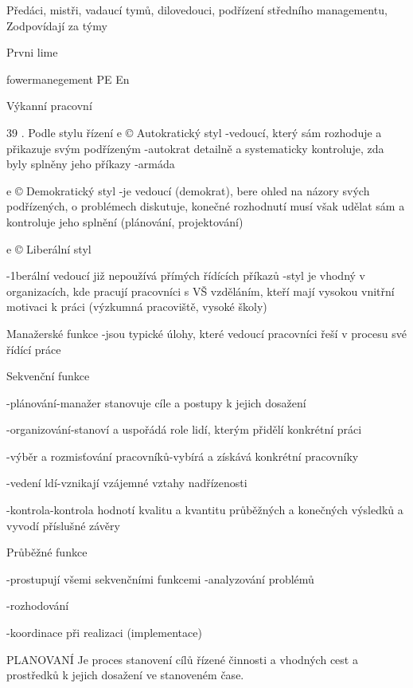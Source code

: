 Předáci, mistři, vadaucí tymů, dilovedouci,
podřízení středního managementu,
Zodpovídají za týmy





Prvni lime

fowermanegement PE En







Výkanní pracovní

39
. Podle stylu řízení
e © Autokratický styl
-vedoucí, který sám rozhoduje a přikazuje svým podřízeným
-autokrat detailně a systematicky kontroluje, zda byly splněny jeho příkazy
-armáda



e © Demokratický styl
-je vedoucí (demokrat), bere ohled na názory svých podřízených, o problémech
diskutuje, konečné rozhodnutí musí však udělat sám a kontroluje jeho splnění
(plánování, projektování)



e © Liberální styl



-1berální vedoucí již nepoužívá přímých řídících příkazů
-styl je vhodný v organizacích, kde pracují pracovníci s VŠ vzděláním, kteří mají
vysokou vnitřní motivaci k práci (výzkumná pracoviště, vysoké školy)

Manažerské funkce
-jsou typické úlohy, které vedoucí pracovníci řeší v procesu své řídící práce

Sekvenční funkce

-plánování-manažer stanovuje cíle a postupy k jejich dosažení

-organizování-stanoví a uspořádá role lidí, kterým přidělí konkrétní práci

-výběr a rozmisťování pracovníků-vybírá a získává konkrétní pracovníky

-vedení ldí-vznikají vzájemné vztahy nadřízenosti

-kontrola-kontrola hodnotí kvalitu a kvantitu průběžných a konečných výsledků
a vyvodí příslušné závěry

Průběžné funkce

-prostupují všemi sekvenčními funkcemi
-analyzování problémů

-rozhodování

-koordinace při realizaci (implementace)

PLANOVANÍ
Je proces stanovení cílů řízené činnosti a vhodných cest a prostředků k jejich dosažení ve
stanoveném čase.

